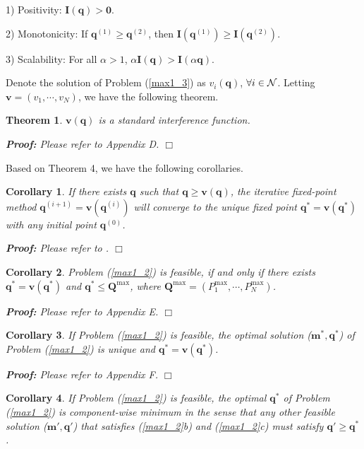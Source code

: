 \documentclass[journal]{IEEEtran}
\newtheorem{theorem}{Theorem}
\newtheorem{coro}{Corollary}
\begin{document}
1) Positivity: $\pmb{I}(\pmb{q}) > \pmb{0}$.

2) Monotonicity: If $\pmb{q}^{(1)} \geq \pmb{q}^{(2)}$, then $\pmb{I}(\pmb{q}^{(1)}) \geq \pmb{I}(\pmb{q}^{(2)})$.

3) Scalability: For all $\alpha >1$, $\alpha \pmb{I}(\pmb{q}) >\pmb{I}(\alpha \pmb{q})$.

Denote the solution of Problem (\ref{max1_3}) as $v_i(\pmb{q})$, $\forall i \in \cal{N}$.
Letting $\pmb{v}=(v_1, \cdots, v_N)$, we have the following theorem.
\begin{theorem}\label{theorempower1}
$\pmb{v}(\pmb{q})$ is a standard interference function.
\end{theorem}

\itshape \textbf{Proof:}  \upshape Please refer to Appendix D. \hfill $\Box$

Based on Theorem 4, we have the following corollaries.

\begin{coro}
If there exists $\pmb q$ such that $\pmb q \geq \pmb v(\pmb q)$, the iterative fixed-point method $\pmb q^{(i+1)}=\pmb v(\pmb q^{(i)})$
will converge to the unique fixed point $\pmb q^* =\pmb v(\pmb q^*)$ with any initial point $\pmb q^{(0)}$.
\end{coro}

\itshape \textbf{Proof:}  \upshape Please refer to \cite[Theorem~2]{yates1995framework}.
\hfill $\Box$
\begin{coro}
Problem (\ref{max1_2}) is feasible, if and only if there exists $\pmb q^*=\pmb v(\pmb q^*)$ and $\pmb q^* \leq \pmb Q^{\max}$, where $\pmb Q^{\max}=(P_1^{\max}, \cdots, P_N^{\max})$.
\end{coro}

\itshape \textbf{Proof:}  \upshape  Please refer to Appendix E.
\hfill $\Box$
\begin{coro}
If Problem (\ref{max1_2}) is feasible, the optimal solution ($\pmb m^*, \pmb q^*$) of Problem (\ref{max1_2}) is unique and $\pmb q^*=\pmb v(\pmb q^*)$.
\end{coro}

\itshape \textbf{Proof:}  \upshape Please refer to Appendix F.
\hfill $\Box$
\begin{coro}
If Problem (\ref{max1_2}) is feasible, the optimal $\pmb q^*$ of Problem (\ref{max1_2}) is component-wise minimum in the sense that any other feasible solution ($\pmb m', \pmb q'$) that satisfies (\ref{max1_2}b) and (\ref{max1_2}c) must satisfy $\pmb q' \geq \pmb q^*$.
\end{coro}
\end{document}
